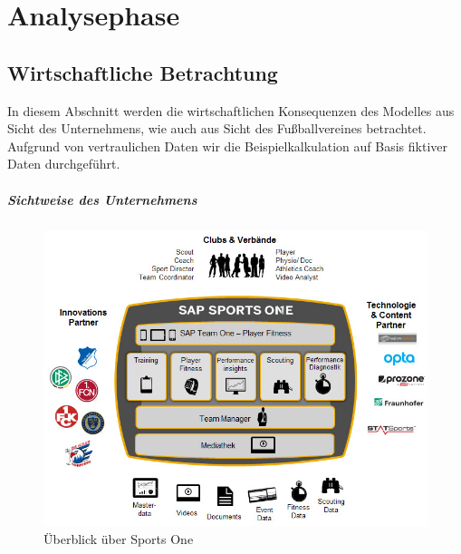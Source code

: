 \chapter{Analysephase}




\section{Wirtschaftliche Betrachtung}
\label{wa}
In diesem Abschnitt werden die wirtschaftlichen Konsequenzen des Modelles aus Sicht des Unternehmens, wie auch aus Sicht des Fußballvereines betrachtet.\enlargethispage{2\baselineskip}  Aufgrund von vertraulichen Daten wir die Beispielkalkulation auf Basis fiktiver Daten durchgeführt.

\paragraph{Sichtweise des Unternehmens}

\begin{figure}[H]
\centering
\includegraphics[scale=0.575]{se-wa-jpg/sportsone}
\caption{Überblick über Sports One}
\label{sportsone}
\end{figure}


